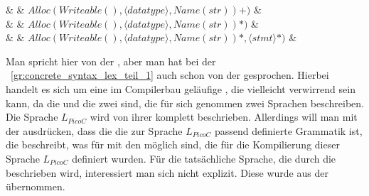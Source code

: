 \begin{grammar}
  & & \qquad $Alloc(Writeable(), \langle datatype\rangle , Name(str))+)$ & \\
  \midrule
  \midrule
  \midrule
  & & \qquad $Alloc(Writeable(), \langle datatype\rangle , Name(str))*)$ & \\
  & & \qquad $Alloc(Writeable(), \langle datatype\rangle , Name(str))*, \langle stmt\rangle *)$ & \\
  \midrule
  \bottomrule
\end{grammar}

\begin{Special_Paragraph}
  Man spricht hier von der , aber man hat bei der ~\ref{gr:concrete_syntax_lex_teil_1} auch schon von der  gesprochen. Hierbei handelt es sich um eine im Compilerbau geläufige , die vielleicht verwirrend sein kann, da die  und die  zwei  sind, die für sich genommen zwei  Sprachen beschreiben. Die Sprache $L_{PicoC}$ wird von ihrer  komplett beschrieben. Allerdings will man mit der  ausdrücken, dass die  die zur Sprache $L_{PicoC}$ passend definierte Grammatik ist, die beschreibt, was für  mit den  möglich sind, die für die Kompilierung dieser Sprache $L_{PicoC}$ definiert wurden. Für die tatsächliche Sprache, die durch die  beschrieben wird, interessiert man sich nicht explizit. Diese  wurde aus der  \cite{g_siek_course_2022} übernommen.
\end{Special_Paragraph}

